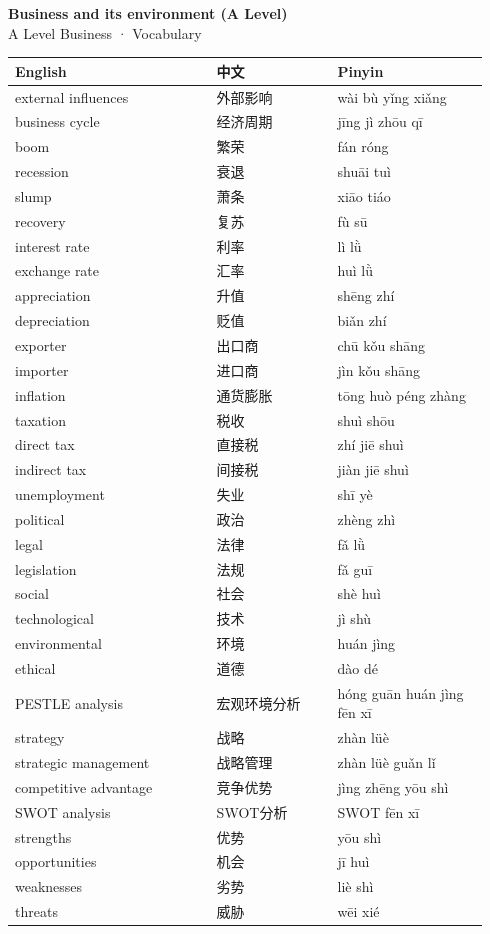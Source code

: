 \documentclass[11pt]{article}
\begin{document}
\begin{center}
  {\LARGE\bfseries Business and its environment (A Level)}\\[0.35em]
  {\large A Level Business · Vocabulary}
\end{center}
\vspace{0.6em}

\begin{longtable}{@{}p{0.40\linewidth}p{0.24\linewidth}p{0.30\linewidth}@{}}
\toprule
\textbf{English} & \textbf{中文} & \textbf{Pinyin} \\
\midrule
\endhead
\bottomrule
\endlastfoot
external influences & 外部影响 & wài bù yǐng xiǎng \\
business cycle & 经济周期 & jīng jì zhōu qī \\
boom & 繁荣 & fán róng \\
recession & 衰退 & shuāi tuì \\
slump & 萧条 & xiāo tiáo \\
recovery & 复苏 & fù sū \\
interest rate & 利率 & lì lǜ \\
exchange rate & 汇率 & huì lǜ \\
appreciation & 升值 & shēng zhí \\
depreciation & 贬值 & biǎn zhí \\
exporter & 出口商 & chū kǒu shāng \\
importer & 进口商 & jìn kǒu shāng \\
inflation & 通货膨胀 & tōng huò péng zhàng \\
taxation & 税收 & shuì shōu \\
direct tax & 直接税 & zhí jiē shuì \\
indirect tax & 间接税 & jiàn jiē shuì \\
unemployment & 失业 & shī yè \\
political & 政治 & zhèng zhì \\
legal & 法律 & fǎ lǜ \\
legislation & 法规 & fǎ guī \\
social & 社会 & shè huì \\
technological & 技术 & jì shù \\
environmental & 环境 & huán jìng \\
ethical & 道德 & dào dé \\
PESTLE analysis & 宏观环境分析 & hóng guān huán jìng fēn xī \\
strategy & 战略 & zhàn lüè \\
strategic management & 战略管理 & zhàn lüè guǎn lǐ \\
competitive advantage & 竞争优势 & jìng zhēng yōu shì \\
SWOT analysis & SWOT分析 & SWOT fēn xī \\
strengths & 优势 & yōu shì \\
opportunities & 机会 & jī huì \\
weaknesses & 劣势 & liè shì \\
threats & 威胁 & wēi xié \\
\end{longtable}
\end{document}
